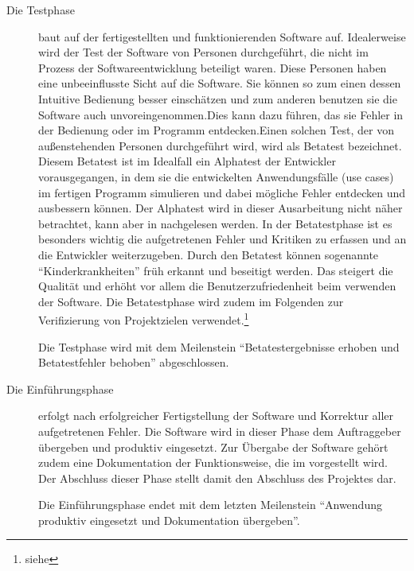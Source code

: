 \begin{description}
  \item[Die Testphase] baut auf der fertigestellten und funktionierenden Software auf.
  Idealerweise wird der Test der Software von Personen durchgeführt, die nicht im Prozess der
  Softwareentwicklung beteiligt waren. Diese Personen haben eine
  unbeeinflusste Sicht auf die Software. Sie können so zum einen dessen
  Intuitive Bedienung besser einschätzen und zum anderen benutzen sie die Software auch
  unvoreingenommen.Dies kann dazu führen, das sie Fehler in der Bedienung oder
  im Programm entdecken.Einen solchen Test, der von außenstehenden Personen
  durchgeführt wird, wird als Betatest bezeichnet. Diesem Betatest ist im
  Idealfall ein Alphatest der Entwickler vorausgegangen, in dem sie die entwickelten Anwendungsfälle (use cases) im fertigen Programm simulieren und dabei mögliche
  Fehler entdecken und ausbessern können. Der Alphatest wird in dieser Ausarbeitung nicht näher betrachtet,
  kann aber in \citet{modelierungUndBetrieb2014} nachgelesen werden.
  In der Betatestphase ist es besonders wichtig die  aufgetretenen Fehler
  und Kritiken zu erfassen und an die Entwickler weiterzugeben. Durch den
  Betatest können sogenannte "`Kinderkrankheiten"' früh erkannt und beseitigt
  werden. Das steigert die Qualität und erhöht vor allem die
  Benutzerzufriedenheit beim verwenden der Software. Die Betatestphase wird zudem im Folgenden
  zur Verifizierung von Projektzielen verwendet.\footnote{siehe }

  Die Testphase wird mit dem Meilenstein "`Betatestergebnisse erhoben und
  Betatestfehler behoben"' abgeschlossen.

  \item[Die Einführungsphase] erfolgt nach erfolgreicher Fertigstellung der Software und Korrektur aller
  aufgetretenen Fehler. Die Software wird in dieser Phase dem Auftraggeber übergeben und produktiv eingesetzt.
  Zur Übergabe der Software gehört zudem eine Dokumentation der Funktionsweise, die im  vorgestellt wird. Der Abschluss dieser Phase stellt damit den Abschluss des Projektes dar.

  Die Einführungsphase endet mit dem letzten Meilenstein "`Anwendung produktiv
  eingesetzt und Dokumentation übergeben"'.

\end{description}